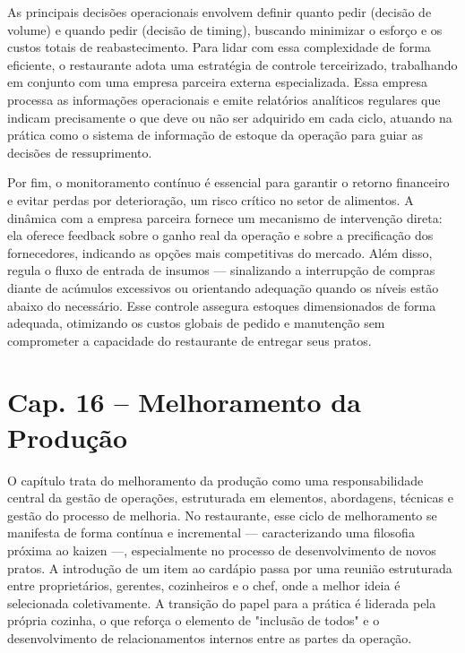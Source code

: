 \documentclass[12pt, a4paper]{article}
\begin{document}
As principais decisões operacionais envolvem definir quanto pedir (decisão de volume) e quando pedir (decisão de timing), buscando minimizar o esforço e os custos totais de reabastecimento. Para lidar com essa complexidade de forma eficiente, o restaurante adota uma estratégia de controle terceirizado, trabalhando em conjunto com uma empresa parceira externa especializada. Essa empresa processa as informações operacionais e emite relatórios analíticos regulares que indicam precisamente o que deve ou não ser adquirido em cada ciclo, atuando na prática como o sistema de informação de estoque da operação para guiar as decisões de ressuprimento.

Por fim, o monitoramento contínuo é essencial para garantir o retorno financeiro e evitar perdas por deterioração, um risco crítico no setor de alimentos. A dinâmica com a empresa parceira fornece um mecanismo de intervenção direta: ela oferece feedback sobre o ganho real da operação e sobre a precificação dos fornecedores, indicando as opções mais competitivas do mercado. Além disso, regula o fluxo de entrada de insumos — sinalizando a interrupção de compras diante de acúmulos excessivos ou orientando adequação quando os níveis estão abaixo do necessário. Esse controle assegura estoques dimensionados de forma adequada, otimizando os custos globais de pedido e manutenção sem comprometer a capacidade do restaurante de entregar seus pratos.



\section{Cap. 16 – Melhoramento da Produção}
O capítulo trata do melhoramento da produção como uma responsabilidade central da gestão de operações, estruturada em elementos, abordagens, técnicas e gestão do processo de melhoria. No restaurante, esse ciclo de melhoramento se manifesta de forma contínua e incremental — caracterizando uma filosofia próxima ao kaizen —, especialmente no processo de desenvolvimento de novos pratos. A introdução de um item ao cardápio passa por uma reunião estruturada entre proprietários, gerentes, cozinheiros e o chef, onde a melhor ideia é selecionada coletivamente. A transição do papel para a prática é liderada pela própria cozinha, o que reforça o elemento de "inclusão de todos" e o desenvolvimento de relacionamentos internos entre as partes da operação.
\end{document}
